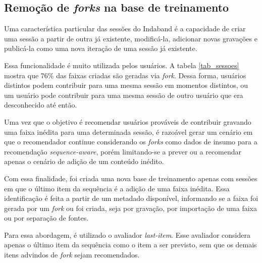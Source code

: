 \subsection{Remoção de \textit{forks} na base de treinamento} 

Uma característica particular das sessões do Indaband é a capacidade de criar
uma sessão a partir de outra já existente, modificá-la, adicionar novas
gravações e publicá-la como uma nova iteração de uma sessão já existente.

Essa funcionalidade é muito utilizada pelos usuários. A tabela \ref{tab_sessoes}
mostra que 76\% das faixas criadas são geradas via \textit{fork}. Dessa forma,
usuários distintos podem contribuir para uma mesma sessão em momentos distintos,
ou um usuário pode contribuir para uma mesma sessão de outro usuário que
era desconhecido até então.

Uma vez que o objetivo é recomendar usuários prováveis de contribuir gravando
uma faixa inédita para uma determinada sessão, é razoável gerar um cenário em
que o recomendador continue considerando os \textit{forks} como dados de insumo
para a recomendação \textit{sequence-aware}, porém limitando-se a prever ou a
recomendar apenas o cenário de adição de um conteúdo inédito.

Com essa finalidade, foi criada uma nova base de treinamento apenas com sessões
em que o último item da sequência é a adição de uma faixa inédita. Essa
identificação é feita a partir de um metadado disponível, informando se a faixa
foi gerada por um \textit{fork} ou foi criada, seja por gravação, por importação
de uma faixa ou por separação de fontes.

Para essa abordagem, é utilizado o avaliador \textit{last-item}. Esse avaliador
considera apenas o último item da sequência como o item a ser previsto, sem que
os demais itens advindos de \textit{fork} sejam recomendados.





